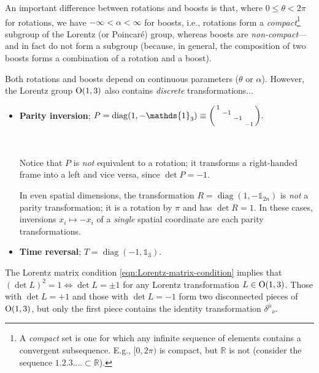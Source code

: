 \noindent
An important difference between rotations and boosts is that, where $0 \le θ < 2π$ for rotations, we have $-\infty < α < \infty$ for boosts, i.e., rotations form a \textit{compact}\footnote{A \textit{compact} set is one for which any infinite sequence of elements contains a convergent subsequence. E.g., $[0, 2π)$ is compact, but $\mathds{R}$ is not (consider the sequence $\qty{1, 2, 3, ...} \subset \mathds{R}$).} subgroup of the Lorentz (or Poincaré) group, whereas boosts are \textit{non-compact}---and in fact do not form a subgroup (because, in general, the composition of two boosts forms a combination of a rotation and a boost).

Both rotations and boosts depend on continuous parameters ($θ$ or $α$).
However, the Lorentz group $\mathrm{O}(1,3)$ also contains \emph{discrete} transformations...
\begin{itemize}

	\item \textbf{Parity inversion};
	\begin{math}
		P = \operatorname{diag}(1, -\mathds{1}_3) \equiv
		\smqty(1 & & & \\ & -1 & & \\ & & -1 & \\ & & & -1)
	.\end{math}

	{\centering
		
	\\}
	Notice that $P$ is \textit{not} equivalent to a rotation; it transforms a right-handed frame into a left and vice versa, since $\det P = -1$.

	\begin{note}
	In even spatial dimensions, the transformation $R = \operatorname{diag}(1, -\mathds{1}_{2n})$ is \textit{not} a parity transformation; it is a rotation by $π$ and has $\det R = 1$.
	In these cases, inversions $x_i \mapsto -x_i$ of a \textit{single} spatial coordinate are each parity transformations.
	\end{note}

	\item \textbf{Time reversal};
	\begin{math}
		T = \operatorname{diag}(-1, \mathds{1}_3)
	.\end{math}
\end{itemize}

The Lorentz matrix condition \eqref{eqn:Lorentz-matrix-condition} implies that $(\det L)^2 = 1 \iff \det L = \pm 1$ for any Lorentz transformation $L \in \mathrm{O}(1,3)$.
Those with $\det L = +1$ and those with $\det L = -1$ form two disconnected pieces of $\mathrm{O}(1,3)$, but only the first piece contains the identity transformation $δ^{\bar μ}{}_ν$.

